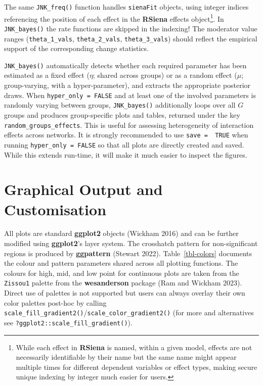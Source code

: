 \documentclass[
  letterpaper,
  DIV=11,
  numbers=noendperiod]{scrartcl}
\begin{document}
The same \texttt{JNK\_freq()} function handles \texttt{sienaFit}
objects, using integer indices referencing the position of each effect
in the \textbf{RSiena} effects object\footnote{While each effect in
  \textbf{RSiena} is named, within a given model, effects are not
  necessarily identifiable by their name but the same name might appear
  multiple times for different dependent variables or effect types,
  making secure unique indexing by integer much easier for users.}. In
\texttt{JNK\_bayes()} the rate functions are skipped in the indexing!
The moderator value ranges (\texttt{theta\_1\_vals},
\texttt{theta\_2\_vals}, \texttt{theta\_3\_vals}) should reflect the
empirical support of the corresponding change statistics.

\texttt{JNK\_bayes()} automatically detects whether each required
parameter has been estimated as a fixed effect (\(\eta\); shared across
groups) or as a random effect (\(\mu\); group-varying, with a
hyper-parameter), and extracts the appropriate posterior draws. When
\texttt{hyper\_only\ =\ FALSE} and at least one of the involved
parameters is randomly varying between groups, \texttt{JNK\_bayes()}
additionally loops over all \(G\) groups and produces group-specific
plots and tables, returned under the key
\texttt{random\_groups\_effects}. This is useful for assessing
heterogeneity of interaction effects across networks. It is strongly
recommended to use \texttt{save\ =\ \ TRUE} when running
\texttt{hyper\_only\ =\ FALSE} so that all plots are directly created
and saved. While this extends run-time, it will make it much easier to
inspect the figures.

\section{Graphical Output and Customisation}\label{sec-graphics}

All plots are standard \textbf{ggplot2} objects (Wickham 2016) and can
be further modified using \textbf{ggplot2}'s layer system. The
crosshatch pattern for non-significant regions is produced by
\textbf{ggpattern} (Stewart 2022). Table~\ref{tbl-colors} documents the
colour and pattern parameters shared across all plotting functions. The
colours for high, mid, and low point for continuous plots are taken from
the \texttt{Zissou1} palette from the \textbf{wesanderson} package (Ram
and Wickham 2023). Direct use of palettes is not supported but users can
always overlay their own color palettes post-hoc by calling
\texttt{scale\_fill\_gradient2()}/\texttt{scale\_color\_gradient2()}
(for more and alternatives see
\texttt{?ggplot2::scale\_fill\_gradient()}).
\end{document}
